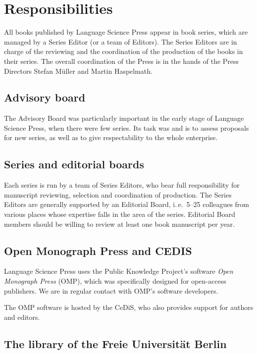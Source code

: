 \section{Responsibilities}

All books published by Language Science Press appear in book series, which are managed by a Series
Editor (or a team of Editors). The Series Editors are in charge of the reviewing and the coordination of the production of
the books in their series. The overall coordination of the Press is in the hands of the Press
Directors Stefan Müller and Martin Haspelmath.

\subsection{Advisory board}

The Advisory Board was particularly important in the early stage of Language Science Press, when there were few series. Its task was and is to assess proposals for new series, as well as to give respectability to the whole enterprise.


\subsection{Series and editorial boards}

Each series is run by a team of Series Editors, who bear full responsibility for manuscript
reviewing, selection and coordination of production. The Series Editors are generally supported by
an Editorial Board, i.\,e.\ 5--25 colleagues from various places whose expertise falls in the area of
the series. Editorial Board members should be willing to review at least one book manuscript per
year.

\subsection{Open Monograph Press and CEDIS}

Language Science Press uses the Public Knowledge Project’s software \emph{Open Monograph Press} (OMP),
which was specifically designed for open-access publishers. We are in regular contact with OMP's
software developers.

The OMP software is hosted by the CeDiS, who also provides support for authors and editors.


\subsection{The library of the Freie Universität Berlin}

